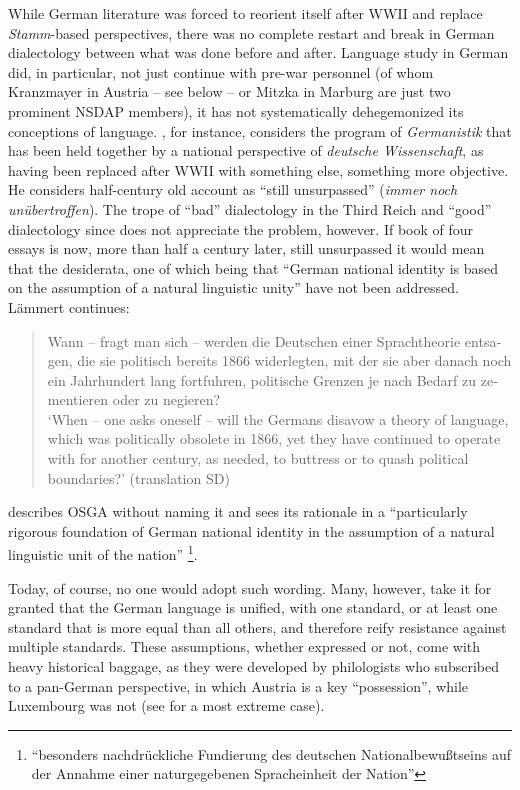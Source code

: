 \documentclass[output=paper]{langscibook}
\begin{document}
While German literature was forced to reorient itself after WWII and replace \textit{Stamm}-based perspectives, there was no complete restart and break in German dialectology between what was done before and after. Language study in German did, in particular, not just continue with pre-war personnel (of whom Kranzmayer in Austria – see below – or Mitzka in Marburg are just two prominent NSDAP members), it has not systematically dehegemonized its conceptions of language. \citet[18]{Auer2013}, for instance, considers the program of \textit{Germanistik} that has been held together by a national perspective of \textit{deutsche Wissenschaft}, as having been replaced after WWII with something else, something more objective. He considers  half-century old account as “still unsurpassed” (\textit{immer noch unübertroffen}). The trope of “bad” dialectology in the Third Reich and “good” dialectology since does not appreciate the problem, however. If  book of four essays is now, more than half a century later, still unsurpassed it would mean that the desiderata, one of which being that “German national identity is based on the assumption of a natural linguistic unity” \citep[34]{Lämmert1967} have not been addressed. Lämmert continues:

\begin{quote}
\foreignlanguage{ngerman}{%
Wann – fragt man sich – werden die Deutschen einer Sprachtheorie entsagen, die sie politisch bereits 1866 widerlegten, mit der sie aber danach noch ein Jahrhundert lang fortfuhren, politische Grenzen je nach Bedarf zu zementieren oder zu negieren? \citep[34]{Lämmert1967}
}\medskip\\
`When – one asks oneself – will the Germans disavow a theory of language, which was politically obsolete in 1866, yet they have continued to operate with for another century, as needed, to buttress or to quash political boundaries?' (translation SD)
\end{quote}

\citet[34]{Lämmert1967} describes OSGA without naming it and sees its rationale in a “particularly rigorous foundation of German national identity in the assumption of a natural linguistic unit of the nation” \footnote{{}“\foreignlanguage{ngerman}{besonders nachdrückliche Fundierung des deutschen Nationalbewußtseins auf der Annahme einer naturgegebenen Spracheinheit der Nation}”}.

Today, of course, no one would adopt such wording. Many, however, take it for granted that the German language is unified, with one standard, or at least one standard that is more equal than all others, and therefore reify resistance against multiple standards. These assumptions, whether expressed or not, come with heavy historical baggage, as they were developed by philologists who subscribed to a pan-German perspective, in which Austria is a key ``possession'', while Luxembourg was not (see \citealt{Dollinger2024} for a most extreme case). 
\end{document}
